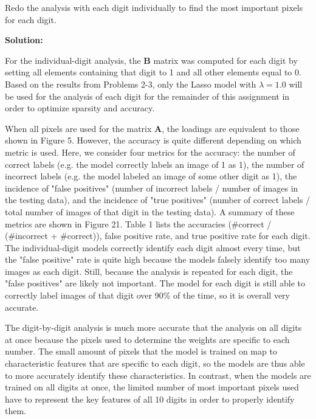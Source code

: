 \documentclass[10pt]{article}
\begin{document}
Redo the analysis with each digit individually to find the most important pixels for each digit.

\vskip 0.5cm
{\bf Solution:} 


For the individual-digit analysis, the $\textbf{B}$ matrix was computed for each digit by setting all elements containing that digit to 1 and all other elements equal to 0. Based on the results from Problems 2-3, only the Lasso model with $\lambda=1.0$ will be used for the analysis of each digit for the remainder of this assignment in order to optimize sparsity and accuracy.

When all pixels are used for the matrix $\textbf{A}$, the loadings are equivalent to those shown in Figure 5. However, the accuracy is quite different depending on which metric is used. Here, we consider four metrics for the accuracy: the number of correct labels (e.g. the model correctly labels an image of 1 as 1), the number of incorrect labels (e.g. the model labeled an image of some other digit as 1), the incidence of "false positives" (number of incorrect labels / number of images in the testing data), and the incidence of "true positives" (number of correct labels / total number of images of that digit in the testing data). A summary of these metrics are shown in Figure 21. Table 1 lists the accuracies (\#correct / (\#incorrect + \#correct)), false positive rate, and true positive rate for each digit. The individual-digit models correctly identify each digit almost every time, but the "false positive" rate is quite high because the models falsely identify too many images as each digit. Still, because the analysis is repeated for each digit, the "false positives" are likely not important. The model for each digit is still able to correctly label images of that digit over 90\% of the time, so it is overall very accurate. 

The digit-by-digit analysis is much more accurate that the analysis on all digits at once because the pixels used to determine the weights are specific to each number. The small amount of pixels that the model is trained on map to characteristic features that are specific to each digit, so the models are thus able to more accurately identify these characteristics. In contrast, when the models are trained on all digits at once, the limited number of most important pixels used have to represent the key features of all 10 digits in order to properly identify them.  %
\end{document}
